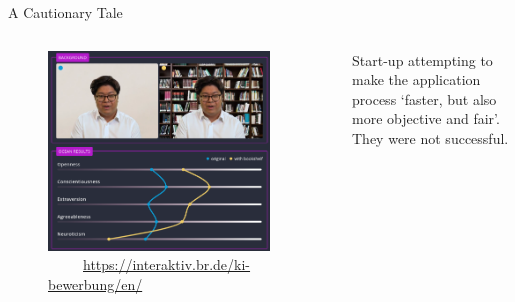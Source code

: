 \documentclass{beamer}
\begin{document}
\begin{frame}{A Cautionary Tale}
	\begin{columns}
		\begin{column}{.6\textwidth}
			\begin{figure}
				\hspace*{.5em}
				\includegraphics[width=.98\textwidth]{img/bias}
				\vspace{-1.5em}
				\centering
				\caption*{\footnotesize \ \ \ \ \ \url{https://interaktiv.br.de/ki-bewerbung/en/}}
			\end{figure}
		\end{column}
		\begin{column}{.03\textwidth}
		\end{column}
		\begin{column}{.4\textwidth}
			Start-up attempting to make the application process `faster, but also more objective and fair'. \pause \newline \\
			They were not successful.
		\end{column}
	\end{columns}
\end{frame}
\end{document}
